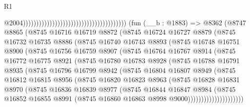 \begin{lexlean}{R1}
\begin{coremodule}
                                                                                  @2004)))))))))))))))))))))))))))))))))))))))
    (fun (__b : @1883) =>
    @8362
      (@8747
        @8865
        (@8745
          @16716
          @16719
          @8872
          (@8745
            @16724
            @16727
            @8879
            (@8745
              @16732
              @16735
              @8886
              (@8745
                @16740
                @16743
                @8893
                (@8745
                  @16748
                  @16751
                  @8900
                  (@8745
                    @16756
                    @16759
                    @8907
                    (@8745
                      @16764
                      @16767
                      @8914
                      (@8745
                        @16772
                        @16775
                        @8921
                        (@8745
                          @16780
                          @16783
                          @8928
                          (@8745
                            @16788
                            @16791
                            @8935
                            (@8745
                              @16796
                              @16799
                              @8942
                              (@8745
                                @16804
                                @16807
                                @8949
                                (@8745
                                  @16812
                                  @16815
                                  @8956
                                  (@8745
                                    @16820
                                    @16823
                                    @8963
                                    (@8745
                                      @16828
                                      @16831
                                      @8970
                                      (@8745
                                        @16836
                                        @16839
                                        @8977
                                        (@8745
                                          @16844
                                          @16847
                                          @8984
                                          (@8745
                                            @16852
                                            @16855
                                            @8991
                                            (@8745 @16860 @16863 @8998 @9000)))))))))))))))))))))

\end{coremodule}
\end{lexlean}
